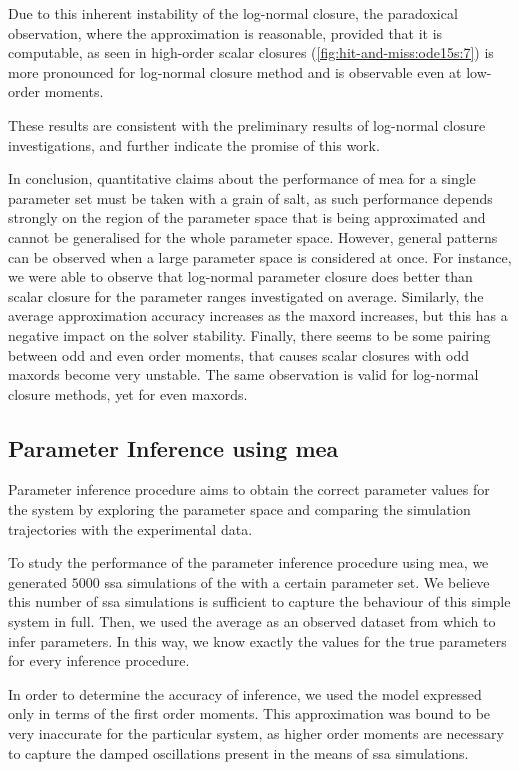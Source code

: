 Due to this inherent instability of the log-normal closure, the paradoxical observation, where the approximation is reasonable, provided that it is computable, as seen in high-order scalar closures (\autoref{fig:hit-and-miss:ode15s:7}) is more pronounced for log-normal closure method and is observable even at low-order moments.

These results are consistent with the preliminary results of log-normal closure investigations\cite{lakatos_preparation_2014}, and further indicate the promise of this work.

In conclusion, quantitative claims about the performance of \gls{mea} for a single parameter set must be taken with a grain of salt, as such performance depends strongly on the region of the parameter space that is being approximated and cannot be generalised for the whole parameter space.
However, general patterns can be observed when a large parameter space is considered at once. For instance, we were able to observe that log-normal parameter closure does better than scalar closure for the parameter ranges investigated on average. 
Similarly, the average approximation accuracy increases as the \gls{maxord} increases, but this has a negative impact on the solver stability.
Finally, there seems to be some pairing between odd and even order moments, that causes scalar closures with odd \gls{maxord}s become very unstable. The same observation is valid for log-normal closure methods, yet for even \gls{maxord}s.

\subsection{Parameter Inference using \acrlong{mea}}
Parameter inference procedure aims to obtain the correct parameter values for the system by exploring the parameter space and comparing the simulation trajectories with the experimental data.

To study the performance of the parameter inference procedure using \acrlong{mea},
we generated $5000$ \acrfull{ssa} simulations of the \pft{} with a certain parameter set. 
We believe this number of \gls{ssa} simulations is sufficient to capture the behaviour of this simple system in full.
Then, we used the average as an observed dataset from which to infer parameters.
In this way, we know exactly the values for the true parameters for every inference procedure.

In order to determine the accuracy of inference, we used the \pft{} model expressed only in terms of the first order moments.
This approximation was bound to be very inaccurate for the particular system, as higher order moments are necessary to capture the damped oscillations present in the means of \gls{ssa} simulations\cite{ale_general_2013}.


